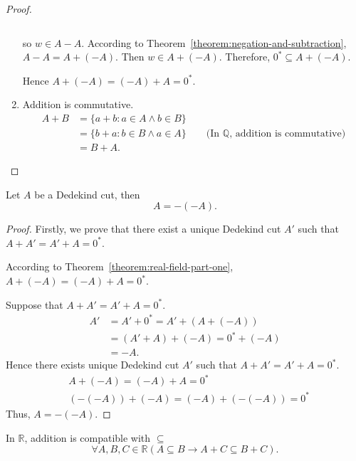 \begin{proof}
\begin{enumerate}[label = (F\arabic*)]
\[              \]
              \par so $w\in A - A$. According to Theorem~\ref{theorem:negation-and-subtraction}, $A - A = A + (-A)$. Then $w\in A + (-A)$. Therefore, ${0}^{*}\subseteq A + (-A)$.
              \bigskip
              \par Hence $A + (-A) = (-A) + A = {0}^{*}$.
        \item Addition is commutative.
              \begin{align*}
                  A + B & = \{ a + b : a\in A\land b\in B \}                                                        \\
                        & = \{ b + a : b\in B\land a\in A \}\qquad\text{(In $\mathbb{Q}$, addition is commutative)} \\
                        & = B + A.
              \end{align*}
    \end{enumerate}
\end{proof}

\begin{theorem}
    \par Let $A$ be a Dedekind cut, then
    \[
        A = -(-A).
    \]
\end{theorem}

\begin{proof}
    Firstly, we prove that there exist a unique Dedekind cut $A'$ such that $A + A' = A' + A = {0}^{*}$.

    According to Theorem~\ref{theorem:real-field-part-one}, $A + (-A) = (-A) + A = {0}^{*}$.

    Suppose that $A + A' = A' + A = {0}^{*}$.
    \begin{align*}
        A' & = A' + {0}^{*} = A' + (A + (-A))   \\
           & = (A' + A) + (-A) = {0}^{*} + (-A) \\
           & = -A.
    \end{align*}
    Hence there exists unique Dedekind cut $A'$ such that $A + A' = A' + A = {0}^{*}$.
    \begin{align*}
         & A + (-A) = (-A) + A = {0}^{*}             \\
         & (-(-A)) + (-A) = (-A) + (-(-A)) = {0}^{*}
    \end{align*}
    Thus, $A = -(-A)$.
\end{proof}

\begin{theorem}
    In $\mathbb{R}$, addition is compatible with $\subseteq$
    \[
        \forall A, B, C\in\mathbb{R}(A\subseteq B \rightarrow A + C\subseteq B + C).
    \]
\end{theorem}

